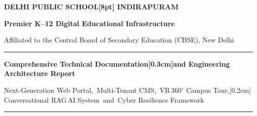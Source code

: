 \documentclass[12pt, a4paper, oneside]{report}
\def\\{}
\def\&{and}
\begin{document}

\begin{titlepage}
  \begin{center}
    \vspace*{1.0cm}

    {\LARGE\bfseries\textcolor{sectioncol}{DELHI PUBLIC SCHOOL\\[8pt] INDIRAPURAM}\par}
    \vspace{0.4cm}
    {\large\bfseries\textcolor{dpsgreen}{Premier K--12 Digital Educational Infrastructure}\par}
    \vspace{0.2cm}
    {\normalsize Affiliated to the Central Board of Secondary Education (CBSE), New Delhi\par}

    \vspace{1.0cm}

    \rule{\textwidth}{1.8pt}\par
    \vspace{0.4cm}
    {\huge\bfseries\textcolor{sectioncol}{%
      Comprehensive Technical Documentation\\[0.3cm]\&
      Engineering Architecture Report}\par}
    \vspace{0.35cm}
    {\large Next-Generation Web Portal,\ Multi-Tenant CMS,\
      VR\,360$^\circ$ Campus Tour,\\[0.2cm]%
      Conversational RAG\,AI System\ \&\ Cyber Resilience Framework\par}
    \vspace{0.4cm}
    \rule{\textwidth}{1.8pt}\par

    \vspace{1.4cm}


\end{center}
\end{titlepage}
\end{document}
